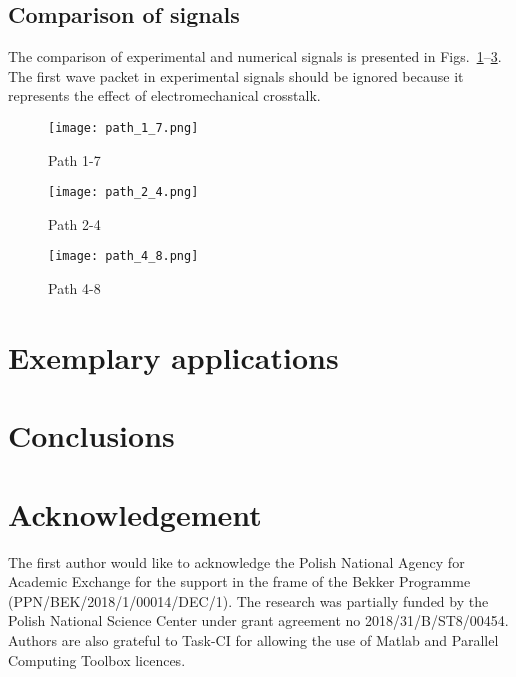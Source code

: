 \documentclass[preprint,12pt]{elsarticle}
\begin{document}
\subsection{Comparison of signals}
The comparison of experimental and numerical signals is presented in Figs.~\ref{fig:path1_7}--\ref{fig:path4_8}. The first wave packet in experimental signals should be ignored because it represents the effect of electromechanical crosstalk.
	\begin{figure} [h!]
			\centering
			\texttt{[image: path\_1\_7.png]}	
			\caption{Path 1-7}
			\label{fig:path1_7}
	\end{figure}
	\begin{figure} [h!]
		\centering
		\texttt{[image: path\_2\_4.png]}	
		\caption{Path 2-4}
		\label{fig:path2_4}
	\end{figure}
	\begin{figure} [h!]
		\centering
		\texttt{[image: path\_4\_8.png]}	
		\caption{Path 4-8}
		\label{fig:path4_8}
	\end{figure}
\clearpage
	\section{Exemplary applications}
	\section{Conclusions}
	
	\section*{Acknowledgement}
	The first author would like to acknowledge the Polish National Agency for Academic Exchange for the support in the frame of the Bekker Programme (PPN/BEK/2018/1/00014/DEC/1). The research was partially funded by the Polish National Science Center under grant agreement no 2018/31/B/ST8/00454. Authors are also grateful to Task-CI for allowing the use of Matlab and Parallel Computing Toolbox licences. 
	
	
	
	
    
	{}
\end{document}
